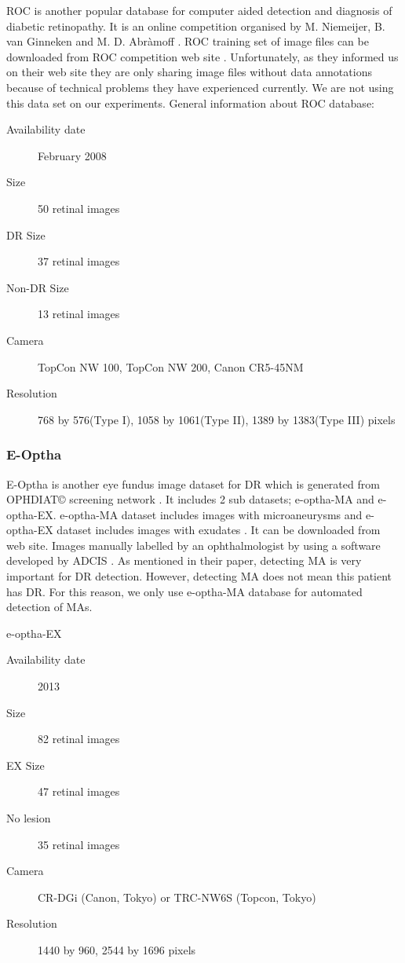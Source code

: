 ROC is another popular database for computer aided detection and diagnosis of diabetic retinopathy. It is an online competition organised by M. Niemeijer, B. van Ginneken and M. D. Abràmoff \citep{niemeijer2010retinopathy}. ROC training set of image files can be downloaded from ROC competition web site \citep{ROC}.   Unfortunately, as they informed us on their web site \citet{ROC} they are only sharing image files without data annotations because of technical problems they have experienced currently. We are not using this data set on our experiments.
General information about ROC database:
\begin{description}
    \item[Availability date] February 2008
    \item[Size] 50 retinal images
    \item[DR Size] 37 retinal images
    \item[Non-DR Size] 13 retinal images
    \item[Camera] TopCon NW 100, TopCon NW 200, Canon CR5-45NM
    \item[Resolution] 768 by 576(Type I), 1058 by 1061(Type II), 1389 by 1383(Type III) pixels
\end{description}

\subsubsection{E-Optha}

E-Optha is another eye fundus image dataset for DR which is generated from OPHDIAT© screening network \citep{massin2008ophdiat}. It includes 2 sub datasets; e-optha-MA and e-optha-EX. e-optha-MA dataset includes images with microaneurysms and e-optha-EX dataset includes images with exudates . It can be downloaded from  \citet{E-Optha} web site. Images manually labelled by an ophthalmologist by using a software developed by ADCIS \citep{decenciere2013teleophta}. As \citet{niemeijer2010retinopathy} mentioned in their paper, detecting MA is very important for DR detection. However, detecting MA does not mean this patient has DR. For this reason, we only use e-optha-MA database for automated detection of MAs. 

e-optha-EX
\begin{description}
    \item[Availability date] 2013
    \item[Size] 82 retinal images
    \item[EX Size] 47 retinal images
    \item[No lesion] 35 retinal images
    \item[Camera] CR-DGi (Canon, Tokyo) or TRC-NW6S (Topcon, Tokyo) \citep{quellec2012multiple}
    \item[Resolution] 1440 by 960, 2544 by 1696 pixels
\end{description}

